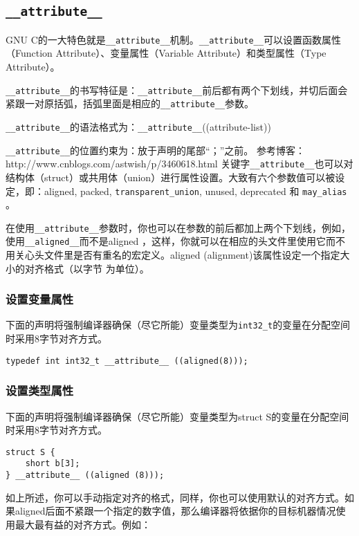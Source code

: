 		\subsection{\texttt{__attribute__}}
			GNU C的一大特色就是\texttt{__attribute__}机制。\texttt{__attribute__}可以设置函数属性（Function Attribute）、变量属性（Variable Attribute）和类型属性（Type Attribute）。

			\texttt{__attribute__}的书写特征是：\texttt{__attribute__}前后都有两个下划线，并切后面会紧跟一对原括弧，括弧里面是相应的\texttt{__attribute__}参数。

			\texttt{__attribute__}的语法格式为：\texttt{__attribute__}((attribute-list))

			\texttt{__attribute__}的位置约束为：放于声明的尾部“；”之前。
			参考博客：http://www.cnblogs.com/astwish/p/3460618.html
			关键字\texttt{__attribute__}也可以对结构体（struct）或共用体（union）进行属性设置。大致有六个参数值可以被设定，即：aligned, packed, \texttt{transparent_union}, unused, deprecated 和 \texttt{may_alias} 。

			在使用\texttt{__attribute__}参数时，你也可以在参数的前后都加上两个下划线，例如，使用\texttt{__aligned__}而不是aligned ，这样，你就可以在相应的头文件里使用它而不用关心头文件里是否有重名的宏定义。aligned (alignment)该属性设定一个指定大小的对齐格式（以字节 为单位）。		

			\subsubsection{设置变量属性}
				下面的声明将强制编译器确保（尽它所能）变量类型为\texttt{int32_t}的变量在分配空间时采用8字节对齐方式。

\begin{verbatim}
typedef int int32_t __attribute__ ((aligned(8)));
\end{verbatim}
			\subsubsection{设置类型属性}

				下面的声明将强制编译器确保（尽它所能）变量类型为struct S的变量在分配空间时采用8字节对齐方式。				
\begin{verbatim}
struct S {
	short b[3];
} __attribute__ ((aligned (8)));
\end{verbatim}

			如上所述，你可以手动指定对齐的格式，同样，你也可以使用默认的对齐方式。如果aligned后面不紧跟一个指定的数字值，那么编译器将依据你的目标机器情况使用最大最有益的对齐方式。例如：

